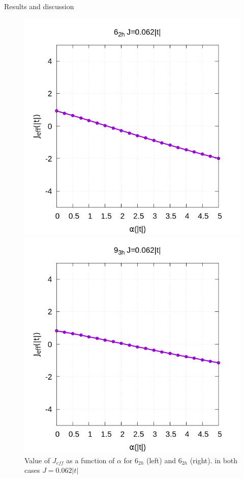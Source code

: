 \documentclass[12pt,twoside]{report}
\begin{document}
\begin{chapter}{Results and discussion}
	\begin{figure}[h!]
		\centering
		\hspace{-2cm}
		\begin{minipage}{0.4\textwidth}
			\includegraphics[scale=0.4]{Jeff_vs_xrep_ar2.png}
		\end{minipage}
		\hspace{2cm}
		\begin{minipage}{0.4\textwidth}
			\includegraphics[scale=0.4]{Jeff_vs_xrep_ar3.png}
		\end{minipage}
		\caption{\label{fig_arxrep} Value of $J_{eff}$ as a function of $\alpha$ for 6$_{2h}$ (left) and 6$_{2h}$ (right). in both cases $J=0.062 |t|$ }
	\end{figure}
	\end{chapter} %
	
\end{document}
